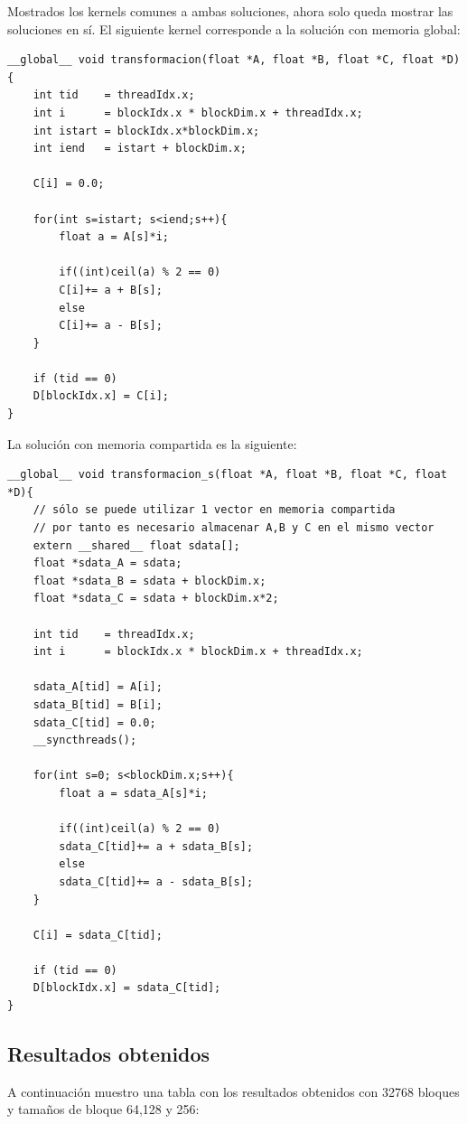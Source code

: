 Mostrados los kernels comunes a ambas soluciones, ahora solo queda mostrar las soluciones en sí. El siguiente kernel corresponde a la solución con memoria global:

\begin{verbatim}
__global__ void transformacion(float *A, float *B, float *C, float *D){
	int tid    = threadIdx.x;
	int i      = blockIdx.x * blockDim.x + threadIdx.x;
	int istart = blockIdx.x*blockDim.x;
	int iend   = istart + blockDim.x;
	
	C[i] = 0.0;
	
	for(int s=istart; s<iend;s++){
		float a = A[s]*i;
		
		if((int)ceil(a) % 2 == 0)
		C[i]+= a + B[s];
		else
		C[i]+= a - B[s];
	}
	
	if (tid == 0)
	D[blockIdx.x] = C[i];
}
\end{verbatim}

La solución con memoria compartida es la siguiente:

\begin{verbatim}
__global__ void transformacion_s(float *A, float *B, float *C, float *D){
	// sólo se puede utilizar 1 vector en memoria compartida
	// por tanto es necesario almacenar A,B y C en el mismo vector
	extern __shared__ float sdata[];
	float *sdata_A = sdata;
	float *sdata_B = sdata + blockDim.x;
	float *sdata_C = sdata + blockDim.x*2;
	
	int tid    = threadIdx.x;
	int i      = blockIdx.x * blockDim.x + threadIdx.x;
	
	sdata_A[tid] = A[i];
	sdata_B[tid] = B[i];
	sdata_C[tid] = 0.0;
	__syncthreads();
	
	for(int s=0; s<blockDim.x;s++){
		float a = sdata_A[s]*i;
		
		if((int)ceil(a) % 2 == 0)
		sdata_C[tid]+= a + sdata_B[s];
		else
		sdata_C[tid]+= a - sdata_B[s];
	}
	
	C[i] = sdata_C[tid];
	
	if (tid == 0)
	D[blockIdx.x] = sdata_C[tid];
}
\end{verbatim}

\subsection{Resultados obtenidos}
A continuación muestro una tabla con los resultados obtenidos con 32768 bloques y tamaños de bloque 64,128 y 256:

